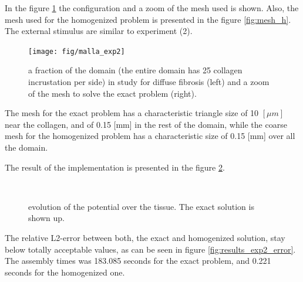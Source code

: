 In the figure \ref{fig:subdomains_R2} the configuration and a zoom of the mesh used is shown. Also, the mesh used for the homogenized problem is presented in the figure \ref{fig:mesh_h}. The external stimulus are similar to experiment (2).

\begin{figure}[H]   
\centering
\texttt{[image: fig/malla\_exp2]}
\caption{ a fraction of the domain (the entire domain has 25 collagen incrustation per side) in study for diffuse fibrosis (left) and a zoom of the mesh to solve the exact problem (right).} \label{fig:subdomains_R2}
\end{figure}

The mesh for the exact problem has a characteristic triangle size of 10 $[\mu m]$ near the collagen, and of 0.15 [mm] in the rest of the domain, while the coarse mesh for the homogenized problem has a characteristic size of 0.15 [mm] over all the domain. 

The result of the implementation is presented in the figure \ref{fig:results_exp2}.

\begin{figure}[H]
\centering
{} \\
\caption{evolution of the potential over the tissue. The exact solution is shown up.} \label{fig:results_exp2}
\end{figure}

The relative L2-error between both, the exact and homogenized solution, stay below totally acceptable values, as can be seen in figure \ref{fig:results_exp2_error}. The  assembly times was 183.085 seconds for the exact problem, and 0.221 seconds for the homogenized one. 

